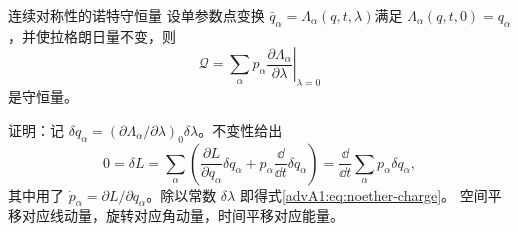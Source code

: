 \begin{advtheorem}{连续对称性的诺特守恒量}\label{advA1:thm:noether}
设单参数点变换
$\bar q_\alpha=\Lambda_\alpha(q,t,\lambda)$满足
$\Lambda_\alpha(q,t,0)=q_\alpha$，并使拉格朗日量不变，则
\begin{equation}\label{advA1:eq:noether-charge}
 \mathcal Q=\sum_\alpha p_\alpha
 \left.\frac{\partial\Lambda_\alpha}{\partial\lambda}\right|_{\lambda=0}
\end{equation}
是守恒量。
\end{advtheorem}
证明：记
$\delta q_\alpha=(\partial\Lambda_\alpha/\partial\lambda)_0\delta\lambda$。不变性给出
\[
 0=\delta L=\sum_\alpha\left(
 \frac{\partial L}{\partial q_\alpha}\delta q_\alpha
 +p_\alpha\frac{\dd}{\dd t}\delta q_\alpha\right)
 =\frac{\dd}{\dd t}\sum_\alpha p_\alpha\delta q_\alpha,
\]
其中用了 $\dot p_\alpha=\partial L/\partial q_\alpha$。除以常数 $\delta\lambda$ 即得式\eqref{advA1:eq:noether-charge}。
空间平移对应线动量，旋转对应角动量，时间平移对应能量。

